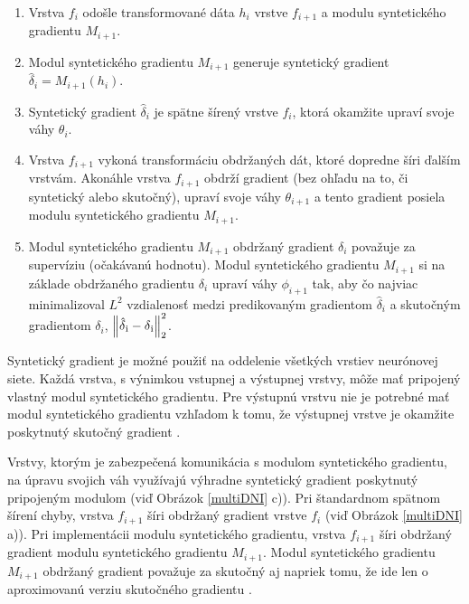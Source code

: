 \begin{enumerate}
    \item Vrstva $f_i$ odošle transformované dáta $h_i$ vrstve $f_{i+1}$ a modulu syntetického gradientu $M_{i+1}$.
    \item Modul syntetického gradientu $M_{i+1}$ generuje syntetický gradient $\hat{\delta}_i=M_{i+1}(h_i)$.
    \item Syntetický gradient $\hat{\delta}_i$ je spätne šírený vrstve $f_i$, ktorá okamžite upraví svoje váhy $\theta_i$.
    \item Vrstva $f_{i+1}$ vykoná transformáciu obdržaných dát, ktoré dopredne šíri ďalším vrstvám. Akonáhle vrstva $f_{i+1}$ obdrží gradient (bez ohľadu na to, či syntetický alebo skutočný), upraví svoje váhy $\theta_{i+1}$ a tento gradient posiela modulu syntetického gradientu $M_{i+1}$.
    \item Modul syntetického gradientu $M_{i+1}$ obdržaný gradient $\delta_i$ považuje za supervíziu (očakávanú hodnotu). Modul syntetického gradientu $M_{i+1}$ si na základe obdržaného gradientu $\delta_i$ upraví váhy $\phi_{i+1}$ tak, aby čo najviac minimalizoval $L^2$ vzdialenosť medzi predikovaným gradientom $\hat{\delta}_i$ a skutočným gradientom $\delta_i$, ${\left\Vert \hat{\delta}\textsubscript{i} - \delta\textsubscript{i}\right\Vert}_{2}^2$.
\end{enumerate}

Syntetický gradient je možné použiť na oddelenie všetkých vrstiev neurónovej siete. Každá vrstva, s výnimkou vstupnej a výstupnej vrstvy, môže mať pripojený vlastný modul syntetického gradientu. Pre výstupnú vrstvu nie je potrebné mať modul syntetického gradientu vzhľadom k tomu, že výstupnej vrstve je okamžite poskytnutý skutočný gradient \cite{Jaderberg2016}.

Vrstvy, ktorým je zabezpečená komunikácia s modulom syntetického gradientu, na úpravu svojich váh využívajú výhradne syntetický gradient poskytnutý pripojeným modulom (viď Obrázok \ref{multiDNI} c)). Pri štandardnom spätnom šírení chyby, vrstva $f_{i+1}$ šíri obdržaný gradient vrstve $f_i$ (viď Obrázok \ref{multiDNI} a)). Pri implementácii modulu syntetického gradientu, vrstva $f_{i+1}$ šíri obdržaný gradient modulu syntetického gradientu $M_{i+1}$. Modul syntetického gradientu $M_{i+1}$ obdržaný gradient považuje za skutočný aj napriek tomu, že ide len o aproximovanú verziu skutočného gradientu \cite{Jaderberg2016}.


